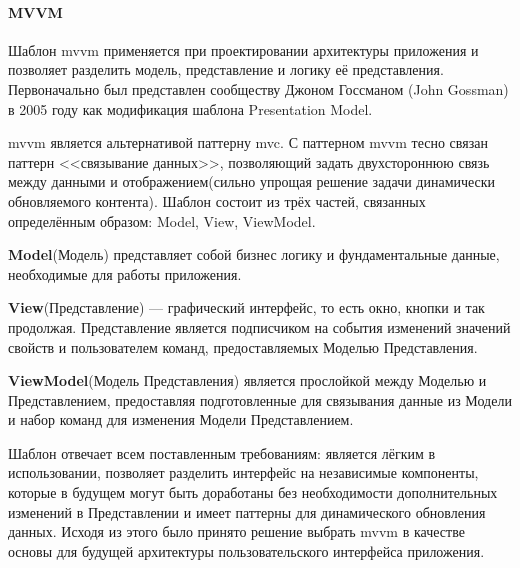 \paragraph {MVVM}
Шаблон \gls{mvvm} применяется при проектировании архитектуры приложения и позволяет разделить модель, представление и логику её представления. Первоначально был представлен сообществу Джоном Госсманом (John Gossman) в 2005 году как модификация шаблона Presentation Model. \cite{wiki:mvvm}

\gls{mvvm} является альтернативой паттерну \gls{mvc}. С паттерном \gls{mvvm} тесно связан паттерн <<связывание данных>>, позволяющий задать двухстороннюю связь между данными и отображением(сильно упрощая решение задачи динамически обновляемого контента). Шаблон состоит из трёх частей, связанных определённым образом: Model, View, ViewModel.

\textbf{Model}(Модель) представляет собой бизнес логику и фундаментальные данные, необходимые для работы приложения.

\textbf{View}(Представление) --- графический интерфейс, то есть окно, кнопки и так продолжая. Представление является подписчиком на события изменений значений свойств и пользователем команд, предоставляемых Моделью Представления.

\textbf{ViewModel}(Модель Представления) является прослойкой между Моделью и Представлением, предоставляя подготовленные для связывания данные из Модели и набор команд для изменения Модели Представлением.

Шаблон отвечает всем поставленным требованиям: является лёгким в использовании, позволяет разделить интерфейс на независимые компоненты, которые в будущем могут быть доработаны без необходимости дополнительных изменений в Представлении и имеет паттерны для динамического обновления данных. Исходя из этого было принято решение выбрать \gls{mvvm} в качестве основы для будущей архитектуры пользовательского интерфейса приложения.